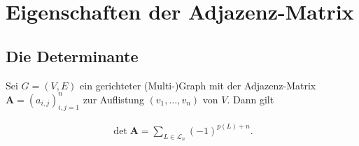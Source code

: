 

        \chapter{Eigenschaften der Adjazenz-Matrix}

    \section{Die Determinante}

        \begin{theorem} \label{thm:det}

            Sei $G = (V, E)$ ein gerichteter (Multi-)Graph mit der Adjazenz-Matrix $\mathbf A = (a_{i,j})_{i,j=1}^n$ zur Auflistung $(v_1, \dots, v_n)$ von $V$.
            Dann gilt

            \begin{align} \label{eq:det_directed}
                \det \mathbf A
                =
                \sum_{L \in \mathcal L_n}
                    (-1)^{p(L) + n}.
            \end{align}

        \end{theorem}


